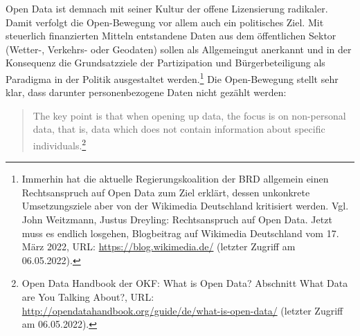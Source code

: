 Open Data ist demnach mit seiner Kultur der offene Lizensierung radikaler. Damit verfolgt die Open-Bewegung vor allem auch ein politisches Ziel. Mit steuerlich finanzierten Mitteln entstandene Daten aus dem öffentlichen Sektor (Wetter-, Verkehrs- oder Geodaten) sollen als Allgemeingut anerkannt und in der Konsequenz die Grundsatzziele der Partizipation und Bürgerbeteiligung als Paradigma in der Politik ausgestaltet werden.\footnote{Immerhin hat die aktuelle Regierungskoalition der BRD allgemein einen Rechtsanspruch auf Open Data zum Ziel erklärt, dessen unkonkrete Umsetzungsziele aber von der Wikimedia Deutschland kritisiert werden. Vgl. John Weitzmann, 
Justus Dreyling: Rechtsanspruch auf Open Data. Jetzt muss es endlich losgehen, Blogbeitrag auf Wikimedia Deutschland vom 17. März 2022, URL: \url{https://blog.wikimedia.de/} (letzter Zugriff am 06.05.2022).} Die Open-Bewegung stellt sehr klar, dass darunter personenbezogene Daten nicht gezählt werden:

\begin{quote}
The key point is that when opening up data, the focus is on non-personal data, that is, data which does not contain information about specific individuals.\footnote{Open Data Handbook der OKF: What is Open Data? Abschnitt What Data are You Talking About?, URL: \url{http://opendatahandbook.org/guide/de/what-is-open-data/} (letzter Zugriff am 06.05.2022).}
\end{quote} 

